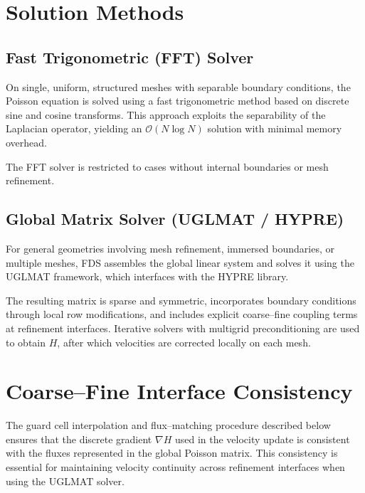 \section{Solution Methods}

\subsection*{Fast Trigonometric (FFT) Solver}

On single, uniform, structured meshes with separable boundary conditions, the Poisson equation is solved using a fast trigonometric method based on discrete sine and cosine transforms. This approach exploits the separability of the Laplacian operator, yielding an $\mathcal{O}(N \log N)$ solution with minimal memory overhead.

The FFT solver is restricted to cases without internal boundaries or mesh
refinement.

\subsection*{Global Matrix Solver (UGLMAT / HYPRE)}

For general geometries involving mesh refinement, immersed boundaries, or multiple meshes, FDS assembles the global linear system and solves it using the UGLMAT framework, which interfaces with the HYPRE library.

The resulting matrix is sparse and symmetric, incorporates boundary conditions through local row modifications, and includes explicit coarse--fine coupling terms at refinement interfaces. Iterative solvers with multigrid preconditioning are used to obtain $H$, after which velocities are corrected locally on each mesh.

\section{Coarse--Fine Interface Consistency}
\label{sec:flux_matching_uglmat}

The guard cell interpolation and flux--matching procedure described below ensures that the discrete gradient $\nabla H$ used in the velocity update is consistent with the fluxes represented in the global Poisson matrix. This consistency is essential for maintaining velocity continuity across refinement interfaces when using the UGLMAT solver.

